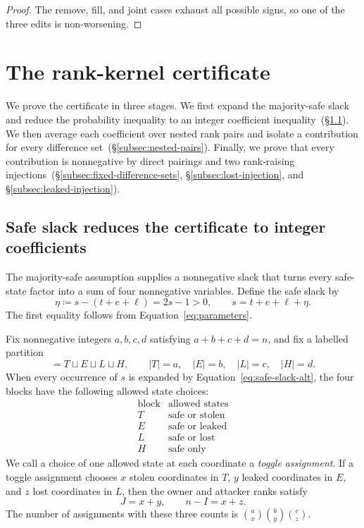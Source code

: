 \documentclass[11pt]{article}
\begin{document}
\begin{proof}
The remove, fill, and joint cases exhaust all possible signs, so one of the three edits is non-worsening.
\end{proof}

  \section{The rank-kernel certificate}

We prove the certificate in three stages.
We first expand the majority-safe slack and reduce the probability inequality to an integer coefficient inequality~(\S\ref{subsec:coefficient-reduction}).
We then average each coefficient over nested rank pairs and isolate a contribution for every difference set~(\S\ref{subsec:nested-pairs}).
Finally, we prove that every contribution is nonnegative by direct pairings and two rank-raising injections~(\S\ref{subsec:fixed-difference-sets}, \S\ref{subsec:lost-injection}, and \S\ref{subsec:leaked-injection}).

    \subsection{Safe slack reduces the certificate to integer coefficients}\label{subsec:coefficient-reduction}

The majority-safe assumption supplies a nonnegative slack that turns every safe-state factor into a sum of four nonnegative variables.
Define the safe slack by
\begin{equation}
\eta\coloneqq s-(t+e+\ell)=2s-1>0,
\qquad
s=t+e+\ell+\eta.
\label{eq:safe-slack-alt}
\end{equation}
The first equality follows from Equation~\eqref{eq:parameters}.

Fix nonnegative integers $a,b,c,d$ satisfying ${a+b+c+d=n}$, and fix a labelled partition
\begin{equation*}
[n]=T\sqcup E\sqcup L\sqcup H,
\qquad
|T|=a,
\quad
|E|=b,
\quad
|L|=c,
\quad
|H|=d.
\end{equation*}
When every occurrence of $s$ is expanded by Equation~\eqref{eq:safe-slack-alt}, the four blocks have the following allowed state choices:
\begin{equation*}
\begin{array}{c|c}
\text{block} & \text{allowed states}\\
\hline
T & \text{safe or stolen}\\
E & \text{safe or leaked}\\
L & \text{safe or lost}\\
H & \text{safe only}
\end{array}
\end{equation*}
We call a choice of one allowed state at each coordinate a \emph{toggle assignment}.
If a toggle assignment chooses $x$ stolen coordinates in $T$, $y$ leaked coordinates in $E$, and $z$ lost coordinates in $L$, then the owner and attacker ranks satisfy
\begin{equation}
J=x+y,
\qquad
n-I=x+z.
\label{eq:toggle-ranks-alt}
\end{equation}
The number of assignments with these three counts is $\binom ax\binom by\binom cz$.
\end{document}
